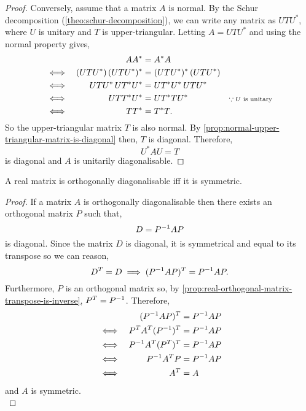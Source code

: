 \documentclass[../MathsNotesBase.tex]{subfiles}
\begin{document}
{\begin{proof}
			Conversely, assume that a matrix $A$ is normal. By the Schur decomposition (\autoref{theo:schur-decomposition}), we can write any matrix as ${ U T U^* }$, where $U$ is unitary and $T$ is upper-triangular. Letting ${ A = U T U^* }$ and using the normal property gives,
			\[\begin{aligned}
				&& A A^* &= A^* A \\
				&\iff & (U T U^*) \, (U T U^*)^* &= (U T U^*)^* \, (U T U^*) &\text{\scriptsize{}} \\
				&\iff & U T U^* \, U T^* U^* &= U T^* U^* \, U T U^* &\text{\scriptsize{}} \\
				&\iff & U T T^* U^* &= U T^* T U^* &\text{\scriptsize{${ \because U \text{ is unitary } }$}} \\
				&\iff & T T^* &= T^* T.
			\end{aligned}\]
			So the upper-triangular matrix $T$ is also normal. By \autoref{prop:normal-upper-triangular-matrix-is-diagonal} then, $T$ is diagonal. Therefore,
			\[ U^* A U = T \]
			is diagonal and $A$ is unitarily diagonalisable.
		\end{proof}
		\begin{corollary}\label{coro:real-matrix-orthogonally-diagonalisable-iff-symmetric}
			A real matrix is orthogonally diagonalisable iff it is symmetric.
		\end{corollary}
		\begin{proof}
			If a matrix $A$ is orthogonally diagonalisable then there exists an orthogonal matrix $P$ such that,
			\[ D = {P}^{-1}AP \]
			is diagonal. Since the matrix $D$ is diagonal, it is symmetrical and equal to its transpose so we can reason,
			\[ D^T = D \implies ({P}^{-1}AP)^T = {P}^{-1}AP. \]
			Furthermore, $P$ is an orthogonal matrix so, by \autoref{prop:real-orthogonal-matrix-transpose-is-inverse}, ${ P^T = {P}^{-1} }$. Therefore,
			\[\begin{aligned}
				&& ({P}^{-1}AP)^T &= {P}^{-1}AP \\
				&\iff & P^T A^T ({P}^{-1})^T &= {P}^{-1}AP \\
				&\iff & {P}^{-1} A^T (P^T)^T &= {P}^{-1}AP \\
				&\iff & {P}^{-1} A^T P &= {P}^{-1}AP \\
				&\iff & A^T &= A
			\end{aligned}\]
			and $A$ is symmetric.\\			
			

\end{proof}}
\end{document}
